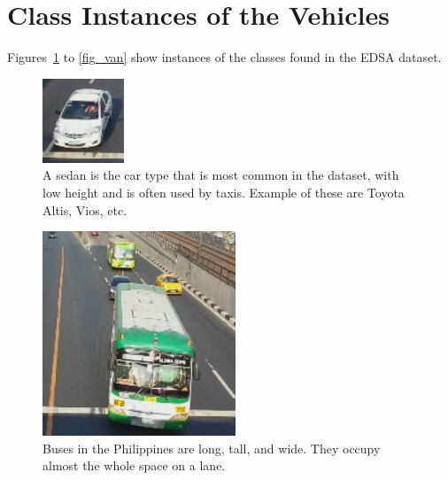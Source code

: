 \documentclass[conference]{IEEEtran}
\begin{document}
\section{Class Instances of the Vehicles}

Figures~\ref{fig_sedan} to \ref{fig_van} show instances of the classes found in the EDSA dataset.

\begin{figure}[!h]
\centering
\includegraphics{vehicle_sedan.png}
\caption{A sedan is the car type that is most common in the dataset, with low height and is often used by taxis. Example of these are Toyota Altis, Vios, etc.}
\label{fig_sedan}
\end{figure}

\begin{figure}[!h]
\centering
\includegraphics{vehicle_bus.png}
\caption{Buses in the Philippines are long, tall, and wide. They occupy almost the whole space  on a lane.}
\label{fig_bus}
\end{figure}
\end{document}
